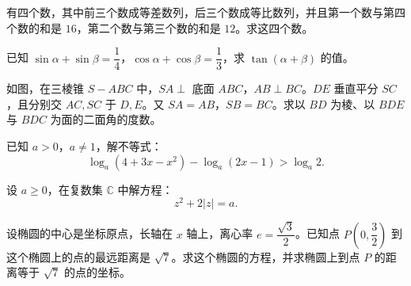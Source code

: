 \begin{question}
有四个数，其中前三个数成等差数列，后三个数成等比数列，并且第一个数与第四个数的和是 $16$，第二个数与第三个数的和是 $12$。求这四个数。

\end{question}
\begin{question}
已知 $\sin\alpha+\sin\beta=\dfrac14$，$\cos\alpha+\cos\beta=\dfrac13$，求 $\tan(\alpha+\beta)$ 的值。

\Needspace{0.4\textheight}
\end{question}
\begin{question}
如图，在三棱锥 $S-ABC$ 中，$SA\perp$ 底面 $ABC$，$AB\perp BC$。$DE$ 垂直平分 $SC$，且分别交 $AC,SC$ 于 $D,E$。又 $SA=AB$，$SB=BC$。求以 $BD$ 为棱、以 $BDE$ 与 $BDC$ 为面的二面角的度数。
\nopagebreak[4]
\begin{center}\end{center}
\nopagebreak[4]
\end{question}
\begin{question}
已知 $a>0$，$a\ne1$，解不等式：
\nopagebreak[4]
\[
\log_a(4+3x-x^2)-\log_a(2x-1)>\log_a2.
\]

\end{question}
\begin{question}
设 $a\ge0$，在复数集 $\mathbb C$ 中解方程：
\nopagebreak[4]
\[
z^2+2|z|=a.
\]

\end{question}
\begin{question}
设椭圆的中心是坐标原点，长轴在 $x$ 轴上，离心率 $e=\dfrac{\sqrt3}{2}$。已知点 $P\left(0,\dfrac32\right)$ 到这个椭圆上的点的最远距离是 $\sqrt7$。求这个椭圆的方程，并求椭圆上到点 $P$ 的距离等于 $\sqrt7$ 的点的坐标。

\end{question}